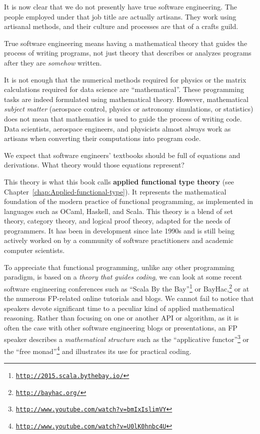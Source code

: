 It is now clear that we do not presently have true software engineering.
The people employed under that job title are actually artisans. They
work using artisanal methods, and their culture and processes are
that of a crafts guild.

True software engineering means having a mathematical theory that
guides the process of writing programs, \textemdash{} not just theory
that describes or analyzes programs after they are \emph{somehow}
written.

It is not enough that the numerical methods required for physics or
the matrix calculations required for data science are \textsf{``}mathematical\textsf{''}.
These programming tasks are indeed formulated using mathematical theory.
However, mathematical \emph{subject matter} (aerospace control, physics
or astronomy simulations, or statistics) does not mean that mathematics
is used to guide the process of writing code. Data scientists, aerospace
engineers, and physicists almost always work as artisans when converting
their computations into program code.

We expect that software engineers\textsf{'} textbooks should be full
of equations and derivations. What theory would those equations represent?

This theory is what this book calls \textbf{applied functional type
theory} (see Chapter~\ref{chap:Applied-functional-type}).
It represents the mathematical foundation of the modern practice of
functional programming, as implemented in languages such as OCaml,
Haskell, and Scala. This theory is a blend of set theory, category
theory, and logical proof theory, adapted for the needs of programmers.
It has been in development since late 1990s and is still being actively
worked on by a community of software practitioners and academic computer
scientists.

To appreciate that functional programming, unlike any other programming
paradigm, is based on a \emph{theory that guides coding}, we can look
at some recent software engineering conferences such as \textsf{``}Scala By
the Bay\textsf{''}\footnote{\texttt{\href{http://2015.scala.bythebay.io/}{http://2015.scala.bythebay.io/}}}
or BayHac,\footnote{\texttt{\href{http://bayhac.org/}{http://bayhac.org/}}}
or at the numerous FP-related online tutorials and blogs. We cannot
fail to notice that speakers devote significant time to a peculiar
kind of applied mathematical reasoning. Rather than focusing on one
or another API or algorithm, as it is often the case with other software
engineering blogs or presentations, an FP speaker describes a \emph{mathematical
structure} \textemdash{} such as the \textsf{``}applicative functor\textsf{''}\footnote{\texttt{\href{http://www.youtube.com/watch?v=bmIxIslimVY}{http://www.youtube.com/watch?v=bmIxIslimVY}}}
or the \textsf{``}free monad\textsf{''}\footnote{\texttt{\href{http://www.youtube.com/watch?v=U0lK0hnbc4U}{http://www.youtube.com/watch?v=U0lK0hnbc4U}}}
\textemdash{} and illustrates its use for practical coding.

